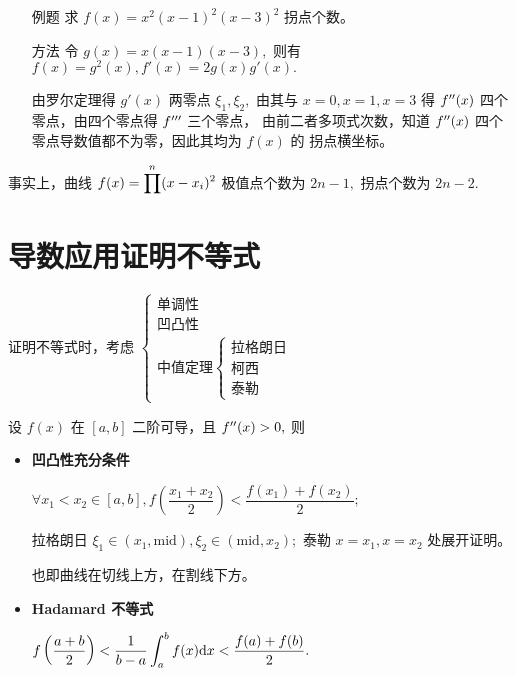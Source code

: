 \begin{enumerate}
    \item[例题] 求 $ f(x) = x^2(x-1)^2(x-3)^2 $ 拐点个数。
    \item[方法] 令 $ g(x) = x(x-1)(x-3), $ 则有 $ f(x) = g^2(x), f'(x) = 2g(x)g'(x). $  
    
    由罗尔定理得 $ g'(x) $ 两零点 $ \xi_1,\xi_2, $ 由其与 $ x = 0, x = 1, x = 3 $ 
    得 $ f^{\prime\prime}(x) $ 四个零点，由四个零点得 $ f^{{\prime\prime}\prime} $ 三个零点，
    由前二者多项式次数，知道 $ f^{\prime\prime}(x) $ 四个零点导数值都不为零，因此其均为 $ f(x) $ 的
    拐点横坐标。
\end{enumerate}

事实上，曲线 $ f(x) = \displaystyle\prod^n (x-x_i)^2 $ 极值点个数为 $ 2n-1, $ 拐点个数为 $ 2n-2. $ 

\section{导数应用证明不等式}

证明不等式时，考虑 $ \begin{cases}
    \textrm{单调性}\\\textrm{凹凸性}\\\textrm{中值定理}
    \begin{cases}
        \textrm{拉格朗日}\\\textrm{柯西}\\\textrm{泰勒}
    \end{cases}
\end{cases} $ 


设 $ f(x) $ 在 $ [a,b] $ 二阶可导，且 $ f^{\prime\prime}(x)>0, $ 则
\begin{itemize}
    \item \textbf{凹凸性充分条件}
    
    $ \forall x_1<x_2\in [a,b], f(\dfrac{x_1+x_2}{2}) < \dfrac{f(x_1)+f(x_2)}{2}; $ 

    拉格朗日 $ \xi_1\in (x_1,\textrm{mid}), \xi_2\in (\textrm{mid},x_2); $ 
    泰勒 $ x=x_1,x=x_2 $ 处展开证明。

    也即曲线在切线上方，在割线下方。
    \item \textbf{Hadamard 不等式}
    
    $ f\left(\dfrac{a+b}{2}\right)<\dfrac{1}{b-a}\displaystyle\int_a^bf(x)\mathrm{d}x<\dfrac{f(a)+f(b)}{2}. $ 
\end{itemize}


